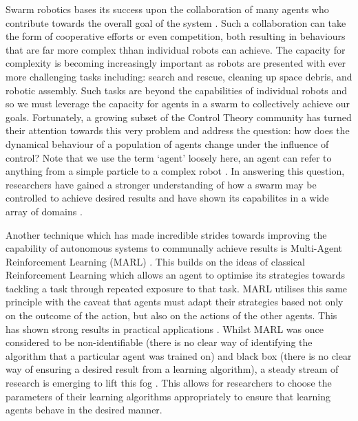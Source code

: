 \documentclass[.../main.tex]{subfiles}
\begin{document}
    Swarm robotics bases its success upon the collaboration of many
    agents who contribute towards the overall goal of the system
    \cite{Hamann2018}. Such a collaboration can take the form of
    cooperative efforts or even competition, both resulting in
    behaviours that are far more complex thhan individual robots can
    achieve. The capacity for complexity is becoming increasingly
    important as robots are presented with ever more challenging tasks
    including: search and rescue, cleaning up space debris, and
    robotic assembly. Such tasks are beyond the capabilities of
    individual robots and so we must leverage the capacity for agents
    in a swarm to collectively achieve our goals. Fortunately, a
    growing subset of the Control Theory community has turned their
    attention towards this very problem and address the question: how
    does the dynamical behaviour of a population of agents change
    under the influence of control?  Note that we use the term `agent'
    loosely here, an agent can refer to anything from a simple
    particle \cite{Roy2017} to a complex robot
    \cite{Elamvazhuthi2019}. In answering this question, researchers
    have gained a stronger understanding of how a swarm may be
    controlled to achieve desired results and have shown its
    capabilites in a wide array of domains \cite{Sahin2005}.

    Another technique which has made incredible strides towards
    improving the capability of autonomous systems to communally
    achieve results is Multi-Agent Reinforcement Learning (MARL)
    \cite{SchwartzMulti-agentApproach}. This builds on the ideas of
    classical Reinforcement Learning which allows an agent to optimise
    its strategies towards tackling a task through repeated exposure
    to that task.  MARL utilises this same principle with the caveat
    that agents must adapt their strategies based not only on the
    outcome of the action, but also on the actions of the other
    agents. This has shown strong results in practical applications
    \cite{Woolridge2009, SchwartzMulti-agentApproach,
      Yang2004}. Whilst MARL was once considered to be
    non-identifiable (there is no clear way of identifying the
    algorithm that a particular agent was trained on) and black box
    (there is no clear way of ensuring a desired result from a
    learning algorithm), a steady stream of research is emerging to
    lift this fog \cite{Bloembergen2015}. This allows for researchers
    to choose the parameters of their learning algorithms
    appropriately to ensure that learning agents behave in the desired
    manner.
\end{document}
